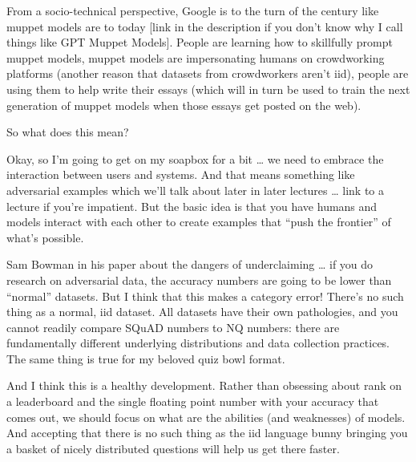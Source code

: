From a socio-technical perspective, Google is to the turn of the century like muppet models are to today [link in the description if you don’t know why I call things like GPT Muppet Models].  People are learning how to skillfully prompt muppet models, muppet models are impersonating humans on crowdworking platforms (another reason that datasets from crowdworkers aren’t iid), people are using them to help write their essays (which will in turn be used to train the next generation of muppet models when those essays get posted on the web).  

So what does this mean?  

Okay, so I’m going to get on my soapbox for a bit … we need to embrace the interaction between users and systems.  And that means something like adversarial examples which we’ll talk about later in later lectures … link to a lecture if you’re impatient.  But the basic idea is that you have humans and models interact with each other to create examples that “push the frontier” of what’s possible.

Sam Bowman in his paper about the dangers of underclaiming … if you do research on adversarial data, the accuracy numbers are going to be lower than “normal” datasets.  But I think that this makes a category error!  There’s no such thing as a normal, iid dataset.  All datasets have their own pathologies, and you cannot readily compare SQuAD numbers to NQ numbers: there are fundamentally different underlying distributions and data collection practices.  The same thing is true for my beloved quiz bowl format.

And I think this is a healthy development.  Rather than obsessing about rank on a leaderboard and the single floating point number with your accuracy that comes out, we should focus on what are the abilities (and weaknesses) of models.  And accepting that there is no such thing as the iid language bunny bringing you a basket of nicely distributed questions will help us get there faster.
